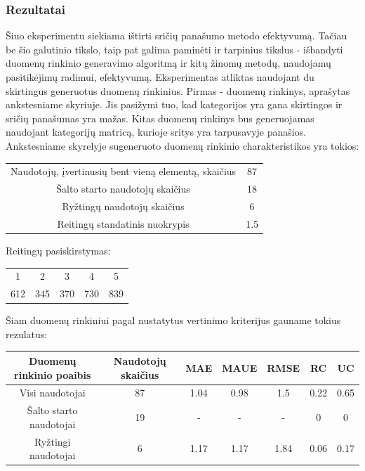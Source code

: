 \documentclass{VUMIFInfMagistrinis}
\begin{document}
\subsubsection{Rezultatai}
Šiuo eksperimentu siekiama ištirti sričių panašumo metodo efektyvumą. Tačiau be šio galutinio tikslo, taip pat galima paminėti ir tarpinius tikslus - išbandyti duomenų rinkinio generavimo algoritmą ir kitų žinomų metodų, naudojamų pasitikėjimų radimui, efektyvumą.
\newline
\indent
Eksperimentas atliktas naudojant du skirtingus generuotus duomenų rinkinius. Pirmas - duomenų rinkinys, aprašytas ankstesniame skyriuje. Jis pasižymi tuo, kad kategorijos yra gana skirtingos ir sričių panašumas yra mažas. Kitas duomenų rinkinys bus generuojamas naudojant kategorijų matricą, kurioje sritys yra tarpusavyje panašios. 
Ankstesniame skyrelyje sugeneruoto duomenų rinkinio charakteristikos yra tokios:
\begin{center}
	\begin{tabular}{||c c||} 
		Naudotojų, įvertinusių bent vieną elementą, skaičius & 87 \\
		Šalto starto naudotojų skaičius & 18 \\
		Ryžtingų naudotojų skaičius  & 6 \\
		Reitingų standatinis nuokrypis & 1.5 \\
	\end{tabular}
\end{center}
Reitingų pasiskirstymas:
\begin{center}
	\begin{tabular}{||c c c c c||} 
		1 & 2 & 3 & 4 & 5 \\
		612 & 345 & 370 & 730 & 839 \\
	\end{tabular}
\end{center}
\indent
Šiam duomenų rinkiniui pagal nustatytus vertinimo kriterijus gauname tokius rezulatus:
\begin{center}
	\begin{tabular}{||c c c c c c c ||} 
		Duomenų rinkinio poaibis & Naudotojų skaičius & MAE & MAUE & RMSE & RC & UC \\
		\hline
		Visi naudotojai & 87 & 1.04 & 0.98 & 1.5 & 0.22 & 0.65 \\
		\hline
		Šalto starto naudotojai & 19 & - & - & - & 0 & 0 \\
		\hline
		Ryžtingi naudotojai & 6 & 1.17 & 1.17 & 1.84 & 0.06 & 0.17 \\
	\end{tabular}
\end{center}
\end{document}
